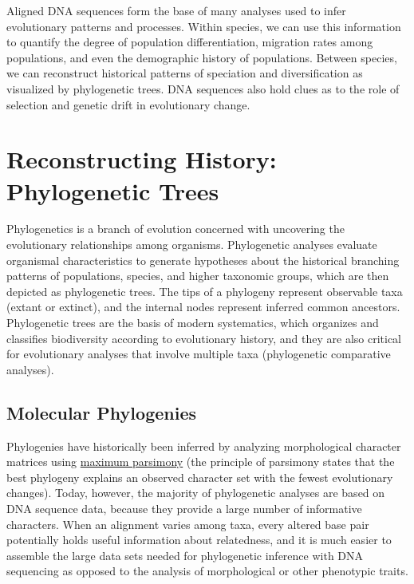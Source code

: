 \documentclass[
]{book}
\begin{document}
Aligned DNA sequences form the base of many analyses used to infer evolutionary patterns and processes. Within species, we can use this information to quantify the degree of population differentiation, migration rates among populations, and even the demographic history of populations. Between species, we can reconstruct historical patterns of speciation and diversification as visualized by phylogenetic trees. DNA sequences also hold clues as to the role of selection and genetic drift in evolutionary change.

\hypertarget{reconstructing-history-phylogenetic-trees}{%
\section{Reconstructing History: Phylogenetic Trees}\label{reconstructing-history-phylogenetic-trees}}

Phylogenetics is a branch of evolution concerned with uncovering the evolutionary relationships among organisms. Phylogenetic analyses evaluate organismal characteristics to generate hypotheses about the historical branching patterns of populations, species, and higher taxonomic groups, which are then depicted as phylogenetic trees. The tips of a phylogeny represent observable taxa (extant or extinct), and the internal nodes represent inferred common ancestors. Phylogenetic trees are the basis of modern systematics, which organizes and classifies biodiversity according to evolutionary history, and they are also critical for evolutionary analyses that involve multiple taxa (phylogenetic comparative analyses).

\hypertarget{molecular-phylogenies}{%
\subsection{Molecular Phylogenies}\label{molecular-phylogenies}}

Phylogenies have historically been inferred by analyzing morphological character matrices using \href{https://en.wikipedia.org/wiki/Maximum_parsimony_(phylogenetics)}{maximum parsimony} (the principle of parsimony states that the best phylogeny explains an observed character set with the fewest evolutionary changes). Today, however, the majority of phylogenetic analyses are based on DNA sequence data, because they provide a large number of informative characters. When an alignment varies among taxa, every altered base pair potentially holds useful information about relatedness, and it is much easier to assemble the large data sets needed for phylogenetic inference with DNA sequencing as opposed to the analysis of morphological or other phenotypic traits.
\end{document}
